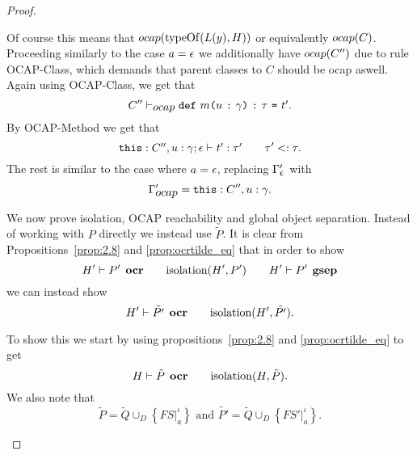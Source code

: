 \begin{proof}
\begin{description}
\begin{description}
          Of course this means that $\mbox{$ocap$}(\mbox{$\mathrm{typeOf}$}(L(y), H))$ or equivalently
          $\mbox{$ocap$}(C)$. Proceeding similarly to the case $a = \mbox{$\epsilon$}$ we
          additionally have $\mbox{$ocap$}(C'')$ due to rule {\sc OCAP-Class}, which
          demands that parent classes to $C$ should be ocap aswell. Again using
          {\sc OCAP-Class}, we get that 
          \begin{equation}
            C'' \vdash_{\mbox{$ocap$}} \mbox{\mdseries\texttt{def}~$m$\texttt{(}$u$~\texttt{:}~$\gamma$\texttt{)}~\texttt{:}~$\tau$~\texttt{=}~$t'$}.
          \end{equation}
          By {\sc OCAP-Method} we get that 
          \begin{equation} \label{eq:ecall-hp9}
            \mbox{$\mbox{\mdseries\texttt{this}}: C'', u: \gamma;\mbox{$\epsilon$}\vdash t':\tau'$}
            \quad\quad \tau' <: \tau.
          \end{equation}
          The rest is similar to the case where $a = \mbox{$\epsilon$}$,
          replacing $\Gamma_{\mbox{$\epsilon$}}'$ with 
          \begin{equation}
            \Gamma'_{\mbox{$ocap$}} = \mbox{\mdseries\texttt{this}}: C'', u: \gamma.
          \end{equation}

          We now prove isolation, OCAP reachability and global object
          separation. Instead of working with $P$ directly we instead use
          $\tilde{P}$. It is clear from Propositions~\ref{prop:2.8} and
          \ref{prop:ocrtilde_eq} that in order to show 
          \begin{equation}
            H' \vdash P' \:\: \mbox{\bf ocr} \quad\quad \mbox{$\mathrm{isolation}$}(H', P') \quad\quad H'
            \vdash P' \:\: \mbox{\bf gsep}
          \end{equation}
          we can instead show
          \begin{equation}
            H' \vdash \tilde{P'} \:\: \mbox{\bf ocr} \quad\quad \mbox{$\mathrm{isolation}$}(H', \tilde{P'}).
          \end{equation}

          To show this we start by using propositions~\ref{prop:2.8} and
          \ref{prop:ocrtilde_eq} to get
          \begin{equation}
            H \vdash \tilde{P} \:\: \mbox{\bf ocr} \quad\quad \mbox{$\mathrm{isolation}$}(H, \tilde{P}).
          \end{equation}
          We also note that 
          \begin{equation}
            \tilde{P} = \tilde{Q} \cup_D \left\{ FS|_a^\iota \right\} \text{ and }
            \tilde{P'} = \tilde{Q} \cup_D \left\{ FS'|_a^\iota \right\}.
          \end{equation}


\end{description}
\end{description}
\end{proof}
